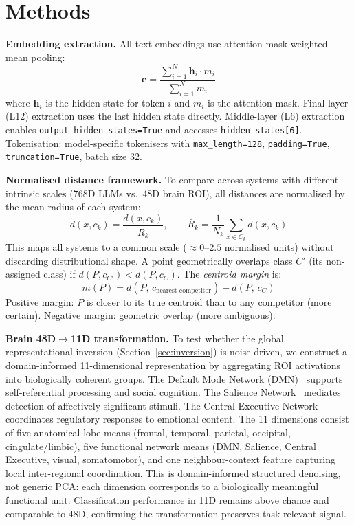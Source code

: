 \documentclass{article}
\begin{document}
\section{Methods}

\textbf{Embedding extraction.}
All text embeddings use attention-mask-weighted mean pooling:
\begin{equation}
  \mathbf{e} = \frac{\sum_{i=1}^{N} \mathbf{h}_i \cdot m_i}{\sum_{i=1}^{N} m_i}
  \label{eq:pooling}
\end{equation}
where $\mathbf{h}_i$ is the hidden state for token $i$ and $m_i$ is the attention mask.
Final-layer (L12) extraction uses the last hidden state directly.
Middle-layer (L6) extraction enables \texttt{output\_hidden\_states=True} and accesses
\texttt{hidden\_states[6]}.
Tokenisation: model-specific tokenisers with \texttt{max\_length=128},
\texttt{padding=True}, \texttt{truncation=True}, batch size 32.

\textbf{Normalised distance framework.}
To compare across systems with different intrinsic scales (768D LLMs vs.\ 48D brain
ROI), all distances are normalised by the mean radius of each system:
\begin{equation}
  \tilde{d}(x, c_k) = \frac{d(x, c_k)}{\bar{R}_k},
  \qquad
  \bar{R}_k = \frac{1}{N_k}\sum_{x \in C_k} d(x, c_k)
  \label{eq:normdist}
\end{equation}
This maps all systems to a common scale ($\approx\!0$--$2.5$ normalised units) without
discarding distributional shape.
A point geometrically overlaps class $C'$ (its non-assigned class) if
$d(P, c_{C'}) < d(P, c_C)$.
The \emph{centroid margin} is:
\begin{equation}
  m(P) = d(P,\, c_{\text{nearest competitor}}) - d(P,\, c_C)
  \label{eq:margin}
\end{equation}
Positive margin: $P$ is closer to its true centroid than to any competitor (more
certain). Negative margin: geometric overlap (more ambiguous).

\textbf{Brain 48D$\to$11D transformation.}
To test whether the global representational inversion (Section~\ref{sec:inversion})
is noise-driven, we construct a domain-informed 11-dimensional representation by
aggregating ROI activations into biologically coherent groups.
The Default Mode Network (DMN)~\citep{li2014dmn} supports self-referential processing
and social cognition.
The Salience Network~\citep{seeley2019} mediates detection of affectively significant
stimuli.
The Central Executive Network~\citep{miller2001} coordinates regulatory responses to
emotional content.
The 11 dimensions consist of five anatomical lobe means (frontal, temporal, parietal,
occipital, cingulate/limbic), five functional network means (DMN, Salience, Central
Executive, visual, somatomotor), and one neighbour-context feature capturing local
inter-regional coordination.
This is domain-informed structured denoising, not generic PCA: each dimension
corresponds to a biologically meaningful functional unit.
Classification performance in 11D remains above chance and comparable to 48D,
confirming the transformation preserves task-relevant signal.
\end{document}
